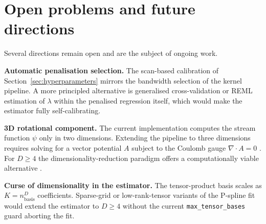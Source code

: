 \documentclass[11pt,a4paper]{article}
\newcommand{\Div}{\nabla\!\cdot\!}
\begin{document}
%
%
%

\section{Open problems and future directions}

Several directions remain open and are the subject of ongoing work.

\textbf{Automatic penalisation selection.} The scan-based calibration of
Section~\ref{sec:hyperparameters} mirrors the bandwidth selection of the
kernel pipeline. A more principled alternative is generalised cross-validation
or REML estimation of $\lambda$ within the penalised regression itself, which
would make the estimator fully self-calibrating.

\textbf{3D rotational component.} The current implementation computes the
stream function $\psi$ only in two dimensions. Extending the pipeline to three
dimensions requires solving for a vector potential $A$ subject to the Coulomb
gauge $\Div A = 0$ \cite{huang2016,wang2016}. For $D \ge 4$ the
dimensionality-reduction paradigm offers a computationally viable alternative
\cite{ddhodge2025}.

\textbf{Curse of dimensionality in the estimator.} The tensor-product basis
scales as $K = n_{\text{basis}}^D$ coefficients. Sparse-grid or
low-rank-tensor variants of the P-spline fit would extend the estimator to
$D \ge 4$ without the current \texttt{max\_tensor\_bases} guard aborting the
fit.
\end{document}
